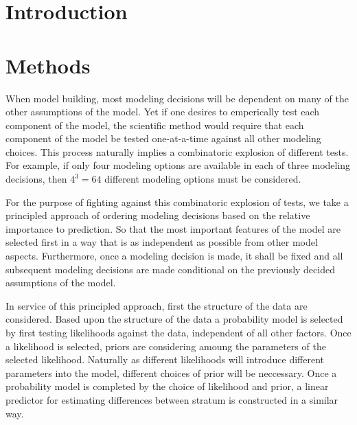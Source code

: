 \documentclass[12pt]{article}
\begin{document}
%
\clearpage
\onehalfspacing
%

%
%
\section{Introduction}\label{introduction}
%
%


%
%
\section{Methods}\label{methods}
%
%

When model building, most modeling decisions will be dependent on many of 
the other assumptions of the model. Yet if one desires to emperically test
each component of the model, the scientific method would require that each 
component of the model be tested one-at-a-time against all other modeling 
choices. This process naturally implies a combinatoric explosion of different 
tests. For example, if only four modeling options are available in each of 
three modeling decisions, then $4^3=64$ different modeling options must be 
considered. 

%
For the purpose of fighting against this combinatoric explosion of tests, we
take a principled approach of ordering modeling decisions based on the relative
importance to prediction. So that the most important features of the model are 
selected first in a way that is as independent as possible from other model 
aspects. Furthermore, once a modeling decision is made, it shall be fixed and 
all subsequent modeling decisions are made conditional on the previously 
decided assumptions of the model.  

%
In service of this principled approach, first the structure of the data are 
considered. Based upon the structure of the data a probability model is selected 
by first testing likelihoods against the data, independent of all other factors. 
Once a likelihood is selected, priors are considering amoung the parameters of 
the selected likelihood. Naturally as different likelihoods will introduce different 
parameters into the model, different choices of prior will be neccessary. Once 
a probability model is completed by the choice of likelihood and prior, a 
linear predictor for estimating differences between stratum is constructed in 
a similar way.
 
\end{document}
